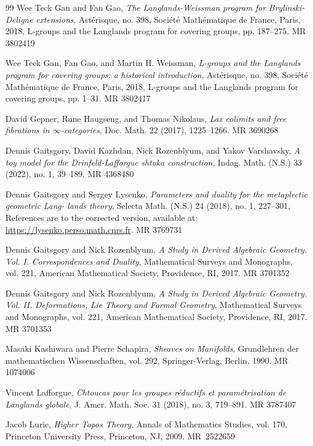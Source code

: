\documentclass[10pt]{amsart}
\theoremstyle{remark}
\begin{document}
\begin{thebibliography}{99}
Wee Teck Gan and Fan Gao, \emph{The Langlands-Weissman program for Brylinski-Deligne extensions},
Ast\'erisque, no. 398, Soci\'et\'e Math\'ematique de France,
Paris, 2018, L-groups and the Langlands program for covering groups, pp. 187--275. MR 3802419

Wee Teck Gan, Fan Gao, and Martin H. Weissman, \emph{L-groups and the Langlands program for covering groups: a historical introduction}, Ast\'erisque, no. 398, Soci\'et\'e Math\'ematique de France, Paris, 2018, L-groups and the Langlands program for
covering groups, pp. 1--31. MR 3802417

David Gepner, Rune Haugseng, and Thomas Nikolaus, \emph{Lax colimits and free fibrations in $\infty$-categories}, 
  Doc. Math. 22 (2017), 1225--1266. MR 3690268

Dennis Gaitsgory, David Kazhdan, Nick Rozenblyum, and Yakov Varshavsky, \emph{A toy model for the
Drinfeld-Lafforgue shtuka construction}, Indag. Math. (N.S.) 33 (2022), no. 1, 39--189. MR 4368480

Dennis Gaitsgory and Sergey Lysenko, \emph{Parameters and duality for the metaplectic geometric Lang-
lands theory}, Selecta Math. (N.S.) 24 (2018), no. 1, 227--301, References are to the corrected version,
available at: \url{https://lysenko.perso.math.cnrs.fr}. MR 3769731

Dennis Gaitsgory and Nick Rozenblyum, \emph{A Study in Derived Algebraic Geometry. Vol. I. Correspondences and Duality}, 
  Mathematical Surveys and Monographs, vol. 221, American Mathematical Society, Providence, RI, 2017. MR 3701352

Dennis Gaitsgory and Nick Rozenblyum, \emph{A Study in Derived Algebraic Geometry. Vol. II. Deformations, Lie Theory and Formal Geometry}, 
  Mathematical Surveys and Monographs, vol. 221, American Mathematical Society, Providence, RI, 2017. MR 3701353


Masaki Kashiwara and Pierre Schapira, \emph{Sheaves on Manifolds}, 
  Grundlehren der mathematischen Wissenschaften, vol. 292, Springer-Verlag, Berlin, 1990. MR 1074006

Vincent Lafforgue, \emph{Chtoucas pour les groupes r\'eductifs et param\'etrisation de Langlands globale},
J. Amer. Math. Soc. 31 (2018), no. 3, 719--891. MR 3787407



Jacob Lurie, \emph{Higher Topos Theory}, 
  Annals of Mathematics Studies, vol. 170, Princeton University Press, Princeton, NJ, 2009. MR~2522659


\end{thebibliography}
\end{document}
